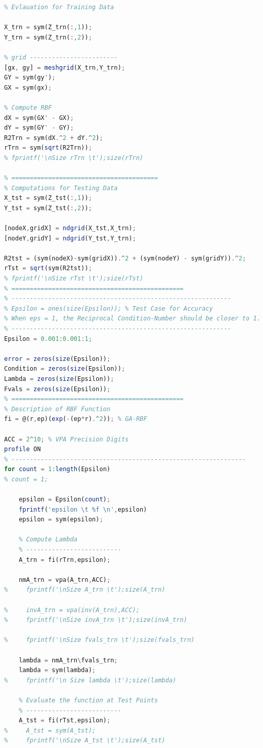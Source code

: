 \documentclass[11pt]{article}
\begin{document}
\begin{lstlisting}[language=octave]
% ===============================================
% Evlauation for Training Data

X_trn = sym(Z_trn(:,1));
Y_trn = sym(Z_trn(:,2));

% grid ------------------------
[gx, gy] = meshgrid(X_trn,Y_trn);
GY = sym(gy');
GX = sym(gx);

% Compute RBF
dX = sym(GX' - GX);
dY = sym(GY' - GY);
R2Trn = sym(dX.^2 + dY.^2);
rTrn = sym(sqrt(R2Trn));
% fprintf('\nSize rTrn \t');size(rTrn)

% ========================================
% Computations for Testing Data
X_tst = sym(Z_tst(:,1));
Y_tst = sym(Z_tst(:,2));

[nodeX,gridX] = ndgrid(X_tst,X_trn);
[nodeY,gridY] = ndgrid(Y_tst,Y_trn);

R2tst = (sym(nodeX)-sym(gridX)).^2 + (sym(nodeY) - sym(gridY)).^2;
rTst = sqrt(sym(R2tst));
% fprintf('\nSize rTst \t');size(rTst)
% ===============================================
% ------------------------------------------------------------
% Epsilon = ones(size(Epsilon)); % Test Case for Accuracy
% When eps = 1, the Reciprocal Condition-Number should be closer to 1.
% ------------------------------------------------------------
Epsilon = 0.001:0.001:1;

error = zeros(size(Epsilon));
Condition = zeros(size(Epsilon));
Lambda = zeros(size(Epsilon));
Fvals = zeros(size(Epsilon));
% ===============================================
% Description of RBF Function
fi = @(r,ep)(exp(-(ep*r).^2)); % GA-RBF

ACC = 2^10; % VPA Precision Digits
profile ON
% ----------------------------------------------------------------
for count = 1:length(Epsilon)
% count = 1;
    
    epsilon = Epsilon(count);
    fprintf('epsilon \t %f \n',epsilon)
    epsilon = sym(epsilon);
    
    % Compute Lambda
    % --------------------------
    A_trn = fi(rTrn,epsilon);
    
    nmA_trn = vpa(A_trn,ACC);
%     fprintf('\nSize A_trn \t');size(A_trn)
    
%     invA_trn = vpa(inv(A_trn),ACC);
%     fprintf('\nSize invA_trn \t');size(invA_trn)    
    
%     fprintf('\nSize fvals_trn \t');size(fvals_trn)
    
    lambda = nmA_trn\fvals_trn;
    lambda = sym(lambda);
%     fprintf('\n Size lambda \t');size(lambda)
    
    % Evaluate the function at Test Points
    % --------------------------
    A_tst = fi(rTst,epsilon);
%     A_tst = sym(A_tst);
%     fprintf('\nSize A_tst \t');size(A_tst)
    

\end{lstlisting}
\end{document}
